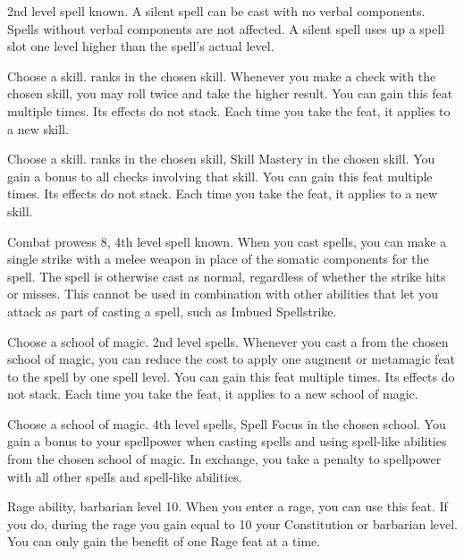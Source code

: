 \featpre 2nd level spell known.
\featben A silent spell can be cast with no verbal components.
Spells without verbal components are not affected.
A silent spell uses up a spell slot one level higher than the spell's actual level.

Choose a skill.
 ranks in the chosen skill.
\featben Whenever you make a check with the chosen skill, you may roll twice and take the higher result.
You can gain this feat multiple times.
Its effects do not stack.
Each time you take the feat, it applies to a new skill.

Choose a skill.
 ranks in the chosen skill, Skill Mastery in the chosen skill.
\featben You gain a  bonus to all checks involving that skill.
You can gain this feat multiple times.
Its effects do not stack.
Each time you take the feat, it applies to a new skill.

\featpre Combat prowess 8, 4th level spell known.
\featben When you cast spells, you can make a single strike with a melee weapon in place of the somatic components for the spell.
The spell is otherwise cast as normal, regardless of whether the strike hits or misses.
This cannot be used in combination with other abilities that let you attack as part of casting a spell, such as Imbued Spellstrike.

Choose a school of magic.
\featpre 2nd level spells.
\featben Whenever you cast a from the chosen school of magic, you can reduce the cost to apply one augment or metamagic feat to the spell by one spell level.
You can gain this feat multiple times.
Its effects do not stack.
Each time you take the feat, it applies to a new school of magic.

Choose a school of magic.
\featpres 4th level spells, Spell Focus in the chosen school.
\featben You gain a  bonus to your spellpower when casting spells and using spell-like abilities from the chosen school of magic.
In exchange, you take a  penalty to spellpower with all other spells and spell-like abilities.

\featpre Rage ability, barbarian level 10.
\featben When you enter a rage, you can use this feat. If you do, during the rage you gain  equal to 10 \add your Constitution or barbarian level.
 You can only gain the benefit of one Rage feat at a time.

